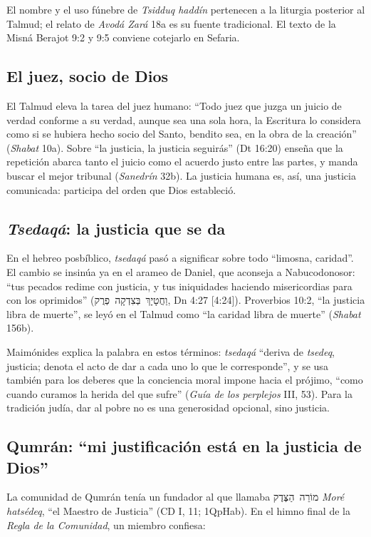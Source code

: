 \documentclass[11pt,letterpaper]{article}
\newcommand{\heb}[1]{\mbox{\foreignlanguage{hebrew}{#1}}}
\begin{document}
\begin{nota}[Precisión]
El nombre y el uso fúnebre de \emph{Tsidduq haddín} pertenecen a la liturgia posterior al Talmud; el relato de \emph{Avodá Zará} 18a es su fuente tradicional. El texto de la Misná Berajot 9:2 y 9:5 conviene cotejarlo en Sefaria.
\end{nota}

\subsection{El juez, socio de Dios}
El Talmud eleva la tarea del juez humano: ``Todo juez que juzga un juicio de verdad conforme a su verdad, aunque sea una sola hora, la Escritura lo considera como si se hubiera hecho socio del Santo, bendito sea, en la obra de la creación'' (\emph{Shabat} 10a). Sobre ``la justicia, la justicia seguirás'' (Dt 16:20) enseña que la repetición abarca tanto el juicio como el acuerdo justo entre las partes, y manda buscar el mejor tribunal (\emph{Sanedrín} 32b). La justicia humana es, así, una justicia comunicada: participa del orden que Dios estableció.

\subsection{\emph{Tsedaqá}: la justicia que se da}
En el hebreo posbíblico, \emph{tsedaqá} pasó a significar sobre todo ``limosna, caridad''. El cambio se insinúa ya en el arameo de Daniel, que aconseja a Nabucodonosor: ``tus pecados redime con justicia, y tus iniquidades haciendo misericordias para con los oprimidos'' (\heb{וַחֲטָיָךְ בְּצִדְקָה פְרֻק}, Dn 4:27 [4:24]). Proverbios 10:2, ``la justicia libra de muerte'', se leyó en el Talmud como ``la caridad libra de muerte'' (\emph{Shabat} 156b).

Maimónides explica la palabra en estos términos: \emph{tsedaqá} ``deriva de \emph{tsedeq}, justicia; denota el acto de dar a cada uno lo que le corresponde'', y se usa también para los deberes que la conciencia moral impone hacia el prójimo, ``como cuando curamos la herida del que sufre'' (\emph{Guía de los perplejos} III, 53). Para la tradición judía, dar al pobre no es una generosidad opcional, sino justicia.

\subsection{Qumrán: ``mi justificación está en la justicia de Dios''}
La comunidad de Qumrán tenía un fundador al que llamaba \heb{מוֹרֵה הַצֶּדֶק} \emph{Moré hatsédeq}, ``el Maestro de Justicia'' (CD I, 11; 1QpHab). En el himno final de la \emph{Regla de la Comunidad}, un miembro confiesa:
\end{document}
